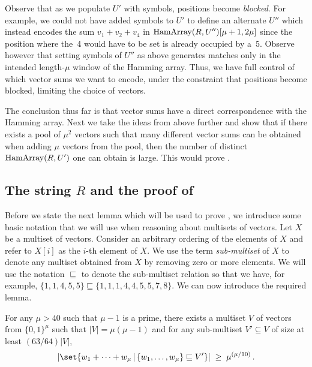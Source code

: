 \documentclass{toc}
\newcommand{\Hamarray}{\ensuremath{\textup{HamArray}}}
\newcommand{\ELL}{\ensuremath{\mu}}
\begin{document}
Observe that as we populate $U'$ with symbols, positions become \emph{blocked}. For example, we could not have added symbols to $U'$ to define an alternate $U''$ which instead encodes the sum $v_1+v_2+v_4$ in $\Hamarray(R,U'')[\mu+1,2\mu]$ since the position where the~4 would have to be set is already occupied by a~5.
Observe however that setting symbols of $U''$ as above generates matches only in the intended
%
length-$\mu$  %
window of the Hamming array. Thus, we have full control of which vector sums we want to encode, under the constraint that positions become blocked, limiting the choice of vectors.

The conclusion thus far is that vector sums have a direct correspondence with the Hamming array. Next we take the ideas from above further and show that if there exists a pool of $\mu^2$ vectors such that many different vector sums can be obtained when adding $\mu$ vectors from the pool, then the number of distinct $\Hamarray(R,U')$ one can obtain is large. This would prove .


\subsection{The string \texorpdfstring{$R$}{R} and the proof of } \label{sec:R}

Before we state the next lemma which will be used to prove ,  we introduce some basic notation that we will use when reasoning about multisets of vectors. Let $X$ be a multiset of vectors. Consider an arbitrary ordering of the elements of $X$ and refer to $X[i]$ as the $i$-th element of $X$.  
We use the term \emph{sub-multiset} of $X$ to denote any multiset obtained from $X$ by removing zero or more elements. We will use the notation $\sqsubseteq$ to denote the sub-multiset relation so that we have, for example,  $\{1,1,4,5,5\} \sqsubseteq \{1,1,1,4,4,5,5,7,8\}$. We can now introduce the required lemma.

\begin{lemma}
	\label{lem:vecsum}
	For any $\ELL>40$ such that $\ELL-1$ is a prime, there exists a multiset $V$ of vectors from
	$\{0,1\}^\ELL$ such that $|V|=\ELL(\ELL-1)$ and for any sub-multiset $V'\subseteq V$ of size at least
	$(63/64)|V|$,
	\begin{align*}
	\left|\set{w_1 + \cdots + w_\ELL \,|\, \{w_1,\dots,w_\ELL\} \sqsubseteq V'}\right| \;\geq\; \ELL^{(\ELL/10)}\,.
	\end{align*}
\end{lemma}
\end{document}
